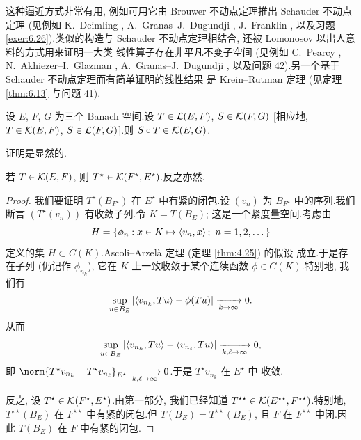 \begin{starremark}
这种逼近方式非常有用, 例如可用它由 Brouwer 不动点定理推出 Schauder 不动点
定理 (见例如 K.~Deimling , A.~Granas--J.~Dugundji , J.~Franklin , 以及习题  \ref{exer:6.26}).类似的构造与
Schauder 不动点定理相结合, 还被 Lomonosov 以出人意料的方式用来证明一大类
线性算子存在非平凡不变子空间 (见例如 C.~Pearcy , N.~Akhiezer--I.~Glazman , A.~Granas--J.~Dugundji , 以及问题
42).另一个基于 Schauder 不动点定理而有简单证明的线性结果
是 Krein--Rutman 定理 (见定理  \ref{thm:6.13} 与问题 41).
\end{starremark}

\begin{proposition}
\label{prop:6.3}
设 $E$, $F$, $G$ 为三个 Banach 空间.设 $T\in\mathcal{L}(E,F)$,
$S\in\mathcal{K}(F,G)$ [相应地, $T\in\mathcal{K}(E,F)$, $S\in\mathcal{L}(F,G)$].则
$S\circ T\in\mathcal{K}(E,G)$.
\end{proposition}

证明是显然的.

\begin{theorem}[Schauder]
\label{thm:6.4}
若 $T\in\mathcal{K}(E,F)$, 则 $T^\star\in\mathcal{K}(F^\star,E^\star)$.反之亦然.
\end{theorem}

\begin{proof}
我们要证明 $T^\star(B_{F^\star})$ 在 $E^\star$ 中有紧的闭包.设 $(v_n)$ 为
$B_{F^\star}$ 中的序列.我们断言 $(T^\star(v_n))$ 有收敛子列.令
$K=T(B_E)$; 这是一个紧度量空间.考虑由
\begin{equation*}
H=\{\phi_n:x\in K\mapsto\left\langle v_n,x\right\rangle;\ n=1,2,\dots\}
\end{equation*}
定义的集 $H\subset C(K)$.Ascoli--Arzelà 定理 (定理  \ref{thm:4.25}) 的假设
成立.于是存在子列 (仍记作 $\phi_{n_k}$), 它在 $K$ 上一致收敛于某个连续函数
$\phi\in C(K)$.特别地, 我们有
\begin{equation*}
\sup_{u\in B_E}\left|\left\langle v_{n_k},Tu\right\rangle-\phi(Tu)\right|\xrightarrow[k\to\infty]{}0.
\end{equation*}
从而
\begin{equation*}
\sup_{u\in B_E}\left|\left\langle v_{n_k},Tu\right\rangle-\left\langle v_{n_\ell},Tu\right\rangle\right|
\xrightarrow[k,\ell\to\infty]{}0,
\end{equation*}
即 $\norm{T^\star v_{n_k}-T^\star v_{n_\ell}}_{E^\star}
\xrightarrow[k,\ell\to\infty]{}0$.于是 $T^\star v_{n_k}$ 在 $E^\star$ 中
收敛.

反之, 设 $T^\star\in\mathcal{K}(F^\star,E^\star)$.由第一部分, 我们已经知道
$T^{\star\star}\in\mathcal{K}(E^{\star\star},F^{\star\star})$.特别地,
$T^{\star\star}(B_E)$ 在 $F^{\star\star}$ 中有紧的闭包.但
$T(B_E)=T^{\star\star}(B_E)$, 且 $F$ 在 $F^{\star\star}$ 中闭.因此
$T(B_E)$ 在 $F$ 中有紧的闭包.
\end{proof}

